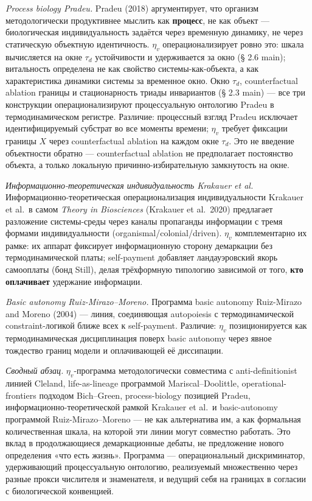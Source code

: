 \documentclass[pdflatex,sn-mathphys-ay]{sn-jnl}
\begin{document}
\emph{Process biology Pradeu.} Pradeu (2018) аргументирует, что организм методологически продуктивнее мыслить как \textbf{процесс}, не как объект --- биологическая индивидуальность задаётся через временную динамику, не через статическую объектную идентичность. \(\eta_v\) операционализирует ровно это: шкала вычисляется на окне \(\tau_d\) устойчивости и удерживается за окно (§ 2.6 main); витальность определена не как свойство системы-как-объекта, а как характеристика динамики системы за временное окно. Окно \(\tau_d\), counterfactual ablation границы и стационарность триады инвариантов (§ 2.3 main) --- все три конструкции операционализируют процессуальную онтологию Pradeu в термодинамическом регистре. Различие: процессный взгляд Pradeu исключает идентифицируемый субстрат во все моменты времени; \(\eta_v\) требует фиксации границы \(X\) через counterfactual ablation на каждом окне \(\tau_d\). Это не введение объектности обратно --- counterfactual ablation не предполагает постоянство объекта, а только локальную причинно-избирательную замкнутость на окне.

\emph{Информационно-теоретическая индивидуальность Krakauer et al.} Информационно-теоретическая операционализация индивидуальности Krakauer et al.~в самом \emph{Theory in Biosciences} (Krakauer et al.~2020) предлагает разложение системы-среды через каналы пропаганды информации с тремя формами индивидуальности (organismal/colonial/driven). \(\eta_v\) комплементарно их рамке: их аппарат фиксирует информационную сторону демаркации без термодинамической платы; self-payment добавляет ландауэровский якорь самооплаты (бонд Still), делая трёхформную типологию зависимой от того, \textbf{кто оплачивает} удержание информации.

\emph{Basic autonomy Ruiz-Mirazo--Moreno.} Программа basic autonomy Ruiz-Mirazo and Moreno (2004) --- линия, соединяющая autopoiesis с термодинамической constraint-логикой ближе всех к self-payment. Различие: \(\eta_v\) позиционируется как термодинамическая дисциплинация поверх basic autonomy через явное тождество границ модели и оплачивающей её диссипации.

\emph{Сводный абзац.} \(\eta_v\)-программа методологически совместима с anti-definitionist линией Cleland, life-as-lineage программой Mariscal--Doolittle, operational-frontiers подходом Bich--Green, process-biology позицией Pradeu, информационно-теоретической рамкой Krakauer et al.~и basic-autonomy программой Ruiz-Mirazo--Moreno --- не как альтернатива им, а как формальная количественная шкала, на которой эти линии могут совместно работать. Это вклад в продолжающиеся демаркационные дебаты, не предложение нового определения «что есть жизнь». Программа --- операциональный дискриминатор, удерживающий процессуальную онтологию, реализуемый множественно через разные прокси числителя и знаменателя, и ведущий себя на границах в согласии с биологической конвенцией.
\end{document}
